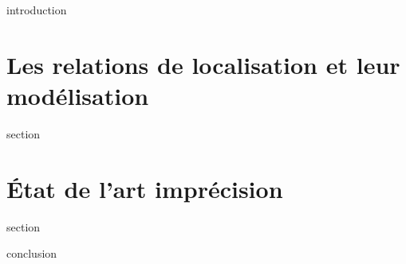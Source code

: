
\chaptertoc{}

\label{sec:3-int}
{introduction}

\section{Les relations de localisation et leur modélisation}
\label{sec:3-1}
{section}

\section{État de l'art imprécision}
\label{sec:3-2}
{section}


\label{sec:3-cnc}
{conclusion}

